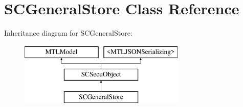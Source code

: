 \hypertarget{interface_s_c_general_store}{}\section{S\+C\+General\+Store Class Reference}
\label{interface_s_c_general_store}
Inheritance diagram for S\+C\+General\+Store\+:\begin{figure}[H]
\begin{center}
\leavevmode
\includegraphics[height=3.000000cm]{interface_s_c_general_store}
\end{center}
\end{figure}
